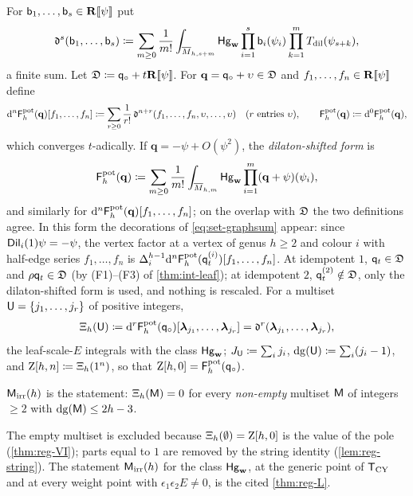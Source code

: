 \begin{defn}
\label{def:set-fpot}
For $\mathsf{b}_1,\ldots,\mathsf{b}_s\in\mathbf{R}[\![ \psi ]\!]$ put
\[
\mathfrak{d}^s(\mathsf{b}_1,\ldots,\mathsf{b}_s)\coloneqq\sum_{m\geq0}\frac{1}{m!}\int_{\overline{M}_{h,s+m}}\mathsf{Hg}_{\mathbf{w}}\prod_{i=1}^{s}\mathsf{b}_i(\psi_i)\prod_{k=1}^{m}T_{\mathrm{dil}}(\psi_{s+k}),
\]
a finite sum. Let $\mathfrak{D}\coloneqq\mathsf{q}_{\circ}+t\mathbf{R}[\![ \psi ]\!]$. For $\mathbf{q}=\mathsf{q}_{\circ}+\upsilon\in\mathfrak{D}$ and $f_1,\ldots,f_n\in\mathbf{R}[\![ \psi ]\!]$ define
\[
\mathrm{d}^n\mathsf{F}^{\mathrm{pot}}_h(\mathbf{q})[f_1,\ldots,f_n]\coloneqq\sum_{r\geq0}\frac{1}{r!}\,\mathfrak{d}^{n+r}(f_1,\ldots,f_n,\upsilon,\ldots,\upsilon)\quad(r\text{ entries }\upsilon),\qquad \mathsf{F}^{\mathrm{pot}}_h(\mathbf{q})\coloneqq\mathrm{d}^0\mathsf{F}^{\mathrm{pot}}_h(\mathbf{q}),
\]
which converges $t$-adically. If $\mathbf{q}=-\psi+O(\psi^2)$, the \emph{dilaton-shifted form} is
\[
\mathsf{F}^{\mathrm{pot}}_h(\mathbf{q})\coloneqq\sum_{m\geq0}\frac{1}{m!}\int_{\overline{M}_{h,m}}\mathsf{Hg}_{\mathbf{w}}\prod_{i=1}^{m}(\mathbf{q}+\psi)(\psi_i),
\]
and similarly for $\mathrm{d}^n\mathsf{F}^{\mathrm{pot}}_h(\mathbf{q})[f_1,\ldots,f_n]$; on the overlap with $\mathfrak{D}$ the two definitions agree. In this form the decorations of \eqref{eq:set-graphsum} appear: since $\mathsf{Dil}_i(1)\psi=-\psi$, the vertex factor at a vertex of genus $h\geq2$ and colour $i$ with half-edge series $f_1,\ldots,f_n$ is $\Delta_i^{h-1}\mathrm{d}^n\mathsf{F}^{\mathrm{pot}}_h(\mathsf{q}_{t}^{(i)})[f_1,\ldots,f_n]$. At idempotent $1$, $\mathsf{q}_{t}\in\mathfrak{D}$ and $\rho\mathsf{q}_{t}\in\mathfrak{D}$ (by (F1)--(F3) of \cref{thm:int-leaf}); at idempotent $2$, $\mathsf{q}_{t}^{(2)}\notin\mathfrak{D}$, only the dilaton-shifted form is used, and nothing is rescaled. For a multiset $\mathsf{U}=\{j_1,\ldots,j_r\}$ of positive integers,
\[
\Xi_h(\mathsf{U})\coloneqq\mathrm{d}^r\mathsf{F}^{\mathrm{pot}}_h(\mathsf{q}_{\circ})[\boldsymbol{\lambda}_{j_1},\ldots,\boldsymbol{\lambda}_{j_r}]=\mathfrak{d}^r(\boldsymbol{\lambda}_{j_1},\ldots,\boldsymbol{\lambda}_{j_r}),
\]
the leaf-scale-$E$ integrals with the class $\mathsf{Hg}_{\mathbf{w}}$; $J_{\mathsf{U}}\coloneqq\sum_ij_i$, $\mathrm{dg}(\mathsf{U})\coloneqq\sum_i(j_i-1)$, and $\mathrm{Z}[h,n]\coloneqq\Xi_h(1^n)$, so that $\mathrm{Z}[h,0]=\mathsf{F}^{\mathrm{pot}}_h(\mathsf{q}_{\circ})$.
\end{defn}

\begin{defn}
\label{def:set-mirr}
$\mathsf{M}_{\mathrm{irr}}(h)$ is the statement: $\Xi_h(\mathsf{M})=0$ for every \emph{non-empty} multiset $\mathsf{M}$ of integers $\geq2$ with $\mathrm{dg}(\mathsf{M})\leq2h-3$.
\end{defn}

The empty multiset is excluded because $\Xi_h(\emptyset)=\mathrm{Z}[h,0]$ is the value of the pole (\cref{thm:reg-VI}); parts equal to $1$ are removed by the string identity (\cref{lem:reg-string}). The statement $\mathsf{M}_{\mathrm{irr}}(h)$ for the class $\mathsf{Hg}_{\mathbf{w}}$, at the generic point of $\mathsf{T}_{\mathrm{CY}}$ and at every weight point with $\epsilon_1\epsilon_2E\neq0$, is the cited \cref{thm:reg-L}.
